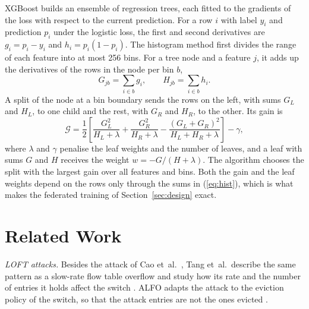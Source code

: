 \documentclass[conference]{IEEEtran}
\newcounter{algo}
\begin{document}
XGBoost \cite{chen2016xgboost} builds an ensemble of regression trees, each fitted to the gradients of
the loss with respect to the current prediction. For a row $i$ with label $y_i$ and prediction $p_i$
under the logistic loss, the first and second derivatives are $g_i = p_i - y_i$ and
$h_i = p_i(1 - p_i)$. The histogram method first divides the range of each feature into at most 256
bins. For a tree node and a feature $j$, it adds up the derivatives of the rows in the node per bin $b$,
\begin{equation}
G_{jb} = \sum_{i \in b} g_i, \qquad H_{jb} = \sum_{i \in b} h_i .
\label{eq:hist}
\end{equation}
A split of the node at a bin boundary sends the rows on the left, with sums $G_L$ and $H_L$, to one child
and the rest, with $G_R$ and $H_R$, to the other. Its gain is
\begin{equation}
\mathcal{G} = \frac{1}{2}\left[\frac{G_L^2}{H_L + \lambda} + \frac{G_R^2}{H_R + \lambda}
 - \frac{(G_L + G_R)^2}{H_L + H_R + \lambda}\right] - \gamma ,
\label{eq:gain}
\end{equation}
where $\lambda$ and $\gamma$ penalise the leaf weights and the number of leaves, and a leaf with sums
$G$ and $H$ receives the weight $w = -G/(H + \lambda)$. The algorithm chooses the split with the largest
gain over all features and bins. Both the gain and the leaf weights depend on the rows only through the
sums in (\ref{eq:hist}), which is what makes the federated training of Section~\ref{sec:design} exact.

\section{Related Work}
\label{sec:related}

\textit{LOFT attacks.} Besides the attack of Cao et~al.\ \cite{cao2017loft}, Tang et~al.\ describe the
same pattern as a slow-rate flow table overflow and study how its rate and the number of entries it
holds affect the switch \cite{tang2023sftoguard}. ALFO adapts the attack to the eviction policy of the
switch, so that the attack entries are not the ones evicted \cite{zeng2024alfo}.
\end{document}
